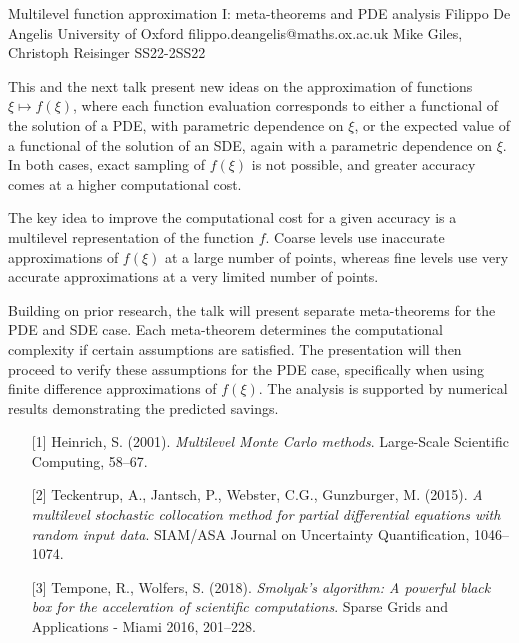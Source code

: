 \begin{talk}
  {Multilevel function approximation I: meta-theorems and PDE analysis}%
  {Filippo De Angelis}%
  {University of Oxford}%
  {filippo.deangelis@maths.ox.ac.uk}%
  {Mike Giles, Christoph Reisinger}%
{}{}{SS22-2}{SS22}


This and the next talk present new ideas on the approximation of functions $\xi \mapsto f(\xi)$, where each function evaluation corresponds to either a functional of the solution of a PDE, with parametric dependence on $\xi$, or the expected value of a functional of the solution of an SDE, again with a parametric dependence on $\xi$. In both cases, exact sampling of $f(\xi)$ is not possible, and greater accuracy comes at a higher computational cost.

The key idea to improve the computational cost for a given accuracy is a multilevel representation of the function $f$. Coarse levels use inaccurate approximations of $f(\xi)$ at a large number of points, whereas fine levels use very accurate approximations at a very limited number of points.

Building on prior research, the talk will present separate meta-theorems for the PDE and SDE case. Each meta-theorem determines the computational complexity if certain assumptions are satisfied. The presentation will then proceed to verify these assumptions for the PDE case, specifically when using finite difference approximations of $f(\xi)$. The analysis is supported by numerical results demonstrating the predicted savings.

\medskip

\begin{enumerate}
	\item[{[1]}] Heinrich, S. (2001). {\it Multilevel Monte Carlo methods}. Large-Scale Scientific Computing, 58–67.
    \item[{[2]}] Teckentrup, A., Jantsch, P., Webster, C.G., Gunzburger, M. (2015). {\it A multilevel stochastic collocation method for partial differential equations with random input data}. SIAM/ASA Journal on Uncertainty Quantification, 1046–1074.
    \item[{[3]}] Tempone, R., Wolfers, S. (2018). {\it Smolyak’s algorithm: A powerful black box for the acceleration of scientific computations}. Sparse Grids and Applications - Miami 2016, 201–228.
\end{enumerate}

\end{talk}

